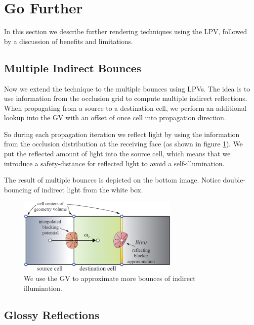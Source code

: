 \section{Go Further}
In this section we describe further rendering techniques using the LPV, followed by a discussion of benefits and limitations.

\subsection{Multiple Indirect Bounces}
Now we extend the technique to the multiple bounces using LPVs. The idea is to use information from the occlusion grid to compute multiple indirect reflections. When propagating from a source to a destination cell, we perform an additional lookup into the GV with an offset of once cell into propagation direction.



So during each propagation iteration we reflect light by using the information from the occlusion distribution at the receiving face (as shown in figure \ref{f:lpv-multiple-indirect-bounces}). We put the reflected amount of light into the source cell, which means that we introduce a safety-distance for reflected light to avoid a self-illumination.



The result of multiple bounces is depicted on the bottom image. Notice double-bouncing of indirect light from the white box.

\begin{figure}\label{f:lpv-multiple-indirect-bounces}
	\begin{center}
		\includegraphics[width=0.7\textwidth]{graphics/lpv/lpv-7}
	\end{center}
	\caption{We use the GV to approximate more bounces of indirect illumination.}
\end{figure}


\subsection{Glossy Reflections}
